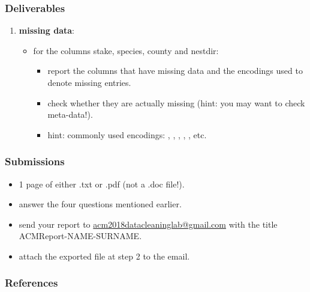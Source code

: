 \documentclass{beamer}					%
\newcommand{\cut}[1]{}
\begin{document}
 \begin{frame}[c]
 \frametitle{Deliverables}
 \begin{enumerate}
 \setcounter{enumi}{\theenumTemp}
\item \textbf{missing data}:
\begin{itemize}
\item for the columns stake, species, county and nestdir:
\begin{itemize}
\item report the columns that have missing data and the encodings used to denote missing entries.
\item check whether they are actually missing (hint: you may want to check meta-data!).
\item hint: commonly used encodings: , , , , , etc. 
\end{itemize}
\end{itemize}
 \end{enumerate}
\end{frame}

\cut{
 \begin{frame}[c]
 \frametitle{Deliverables - Bonus}
 \begin{itemize}
 \item Traffic Violations dataset at \footnotesize{\url{https://catalog.data.gov/dataset/traffic-violations-56dda}}.
 \item import the subset of the original data given in datasets/traffic\_violations\_subset.csv.
 \item meta-data at meta-data/traffic\_violations.json.
 \item look at the columns named \say{Make} and \say{Driver City}.
 \item report the data quality issues.
 \item use OpenRefine to clean the data and explain which feature you used.
 \end{itemize}
\end{frame}
}

\begin{frame}[c]
 \frametitle{Submissions}
 \begin{itemize}
\item 1 page of either .txt or .pdf (not a .doc file!).
\item answer the four questions mentioned earlier.
\item send your report to \footnotesize{\url{acm2018datacleaninglab@gmail.com}} with the title ACMReport-NAME-SURNAME.
\item attach the exported file at step 2 to the email.
 \end{itemize}
\end{frame}

\begin{frame}[t, allowframebreaks]
\frametitle{References}

\end{frame}
\end{document}
